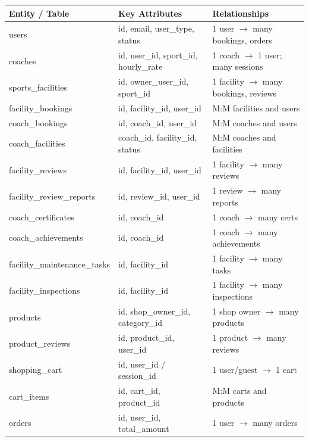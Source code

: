 \documentclass[12pt,a4paper]{report}
\begin{document}
\begin{center}
\begin{longtable}{p{4.5cm} p{4cm} p{5.5cm}}
\toprule
\textbf{Entity / Table} & \textbf{Key Attributes} & \textbf{Relationships}\\
\midrule
\endhead
users                  & id, email, user\_type, status           & 1 user $\to$ many bookings, orders\\
coaches                & id, user\_id, sport\_id, hourly\_rate   & 1 coach $\to$ 1 user; many sessions\\
sports\_facilities     & id, owner\_user\_id, sport\_id          & 1 facility $\to$ many bookings, reviews\\
facility\_bookings     & id, facility\_id, user\_id              & M:M facilities and users\\
coach\_bookings        & id, coach\_id, user\_id                 & M:M coaches and users\\
coach\_facilities      & coach\_id, facility\_id, status         & M:M coaches and facilities\\
facility\_reviews      & id, facility\_id, user\_id              & 1 facility $\to$ many reviews\\
facility\_review\_reports & id, review\_id, user\_id             & 1 review $\to$ many reports\\
coach\_certificates    & id, coach\_id                           & 1 coach $\to$ many certs\\
coach\_achievements    & id, coach\_id                           & 1 coach $\to$ many achievements\\
facility\_maintenance\_tasks & id, facility\_id                  & 1 facility $\to$ many tasks\\
facility\_inspections  & id, facility\_id                        & 1 facility $\to$ many inspections\\
products               & id, shop\_owner\_id, category\_id       & 1 shop owner $\to$ many products\\
product\_reviews       & id, product\_id, user\_id               & 1 product $\to$ many reviews\\
shopping\_cart         & id, user\_id / session\_id              & 1 user/guest $\to$ 1 cart\\
cart\_items            & id, cart\_id, product\_id               & M:M carts and products\\
orders                 & id, user\_id, total\_amount             & 1 user $\to$ many orders\\

\end{longtable}
\end{center}
\end{document}
